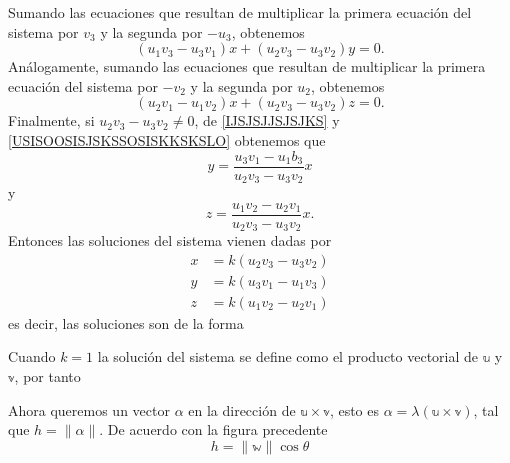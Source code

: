 Sumando las ecuaciones que resultan de multiplicar la primera ecuación del sistema por $v_3$ y la segunda por $-u_3$, obtenemos
\begin{equation}
    \left(u_1 v_3-u_3 v_1\right) x+\left(u_2 v_3-u_3 v_2\right) y = 0. \label{IJSJSJJSJSJKS}
\end{equation}
Análogamente, sumando las ecuaciones que resultan de multiplicar la primera ecuación del sistema por $-v_2$ y la segunda por $u_2$, obtenemos
\begin{equation}
    \left(u_2 v_1-u_1 v_2\right) x+\left(u_2 v_3-u_3 v_2\right) z = 0. \label{USISOOSISJSKSSOSISKKSKSLO}
\end{equation}
Finalmente, si $u_2v_3 - u_3v_2 \neq 0$, de \eqref{IJSJSJJSJSJKS} y \eqref{USISOOSISJSKSSOSISKKSKSLO} obtenemos que
$$y = \frac{u_3 v_1-u_1 b_3}{u_2 v_3-u_3 v_2} x$$
y
$$z = \frac{u_1 v_2-u_2 v_1}{u_2 v_3-u_3 v_2} x.$$
\newpage
Entonces las soluciones del sistema vienen dadas por
\begin{align*}
    x & = k\left(u_2 v_3-u_3 v_2\right) \\
    y & = k\left(u_3 v_1-u_1 v_3\right) \\
    z & = k\left(u_1 v_2-u_2 v_1\right)
\end{align*}
es decir, las soluciones son de la forma
\begin{matrizn}
\end{matrizn}
Cuando $k = 1$ la solución del sistema se define como el producto vectorial de $\mathbb{u}$ y $\mathbb{v}$, por tanto
\begin{matrizn}
\end{matrizn}
Ahora queremos un vector $\alpha$ en la dirección de $\mathbb{u} \times \mathbb{v}$, esto es $\alpha = \lambda(\mathbb{u} \times \mathbb{v})$, tal que $h = \|\alpha\|$. De acuerdo con la figura precedente
$$h = \| \mathbb{w} \| \cos \theta$$
